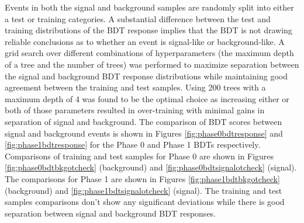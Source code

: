 Events in both the signal and background samples are randomly split into either a test or training categories.  A substantial difference between the test and training distributions of the BDT response implies that the BDT is not drawing reliable conclusions as to whether an event is signal-like or background-like.  A grid search over different combinations of hyperparameters (the maximum depth of a tree and the number of trees) was performed to maximize separation between the signal and background BDT response distributions while maintaining good agreement between the training and test samples.  Using 200 trees with a maximum depth of 4 was found to be the optimal choice as increasing either or both of those parameters resulted in over-training with minimal gains in separation of signal and background. The comparison of BDT scores between signal and background events is shown in Figures \ref{fig:phase0bdtresponse} and \ref{fig:phase1bdtresponse} for the Phase 0 and Phase 1 BDTs respectively.  Comparisons of training and test samples for Phase 0 are shown in Figures \ref{fig:phase0bdtbkgotcheck} (background) and \ref{fig:phase0bdtsignalotcheck} (signal).  The comparisons for Phase 1 are shown in Figures \ref{fig:phase1bdtbkgotcheck} (background) and \ref{fig:phase1bdtsignalotcheck} (signal). The training and test samples comparisons don't show any significant deviations while there is good separation between signal and background BDT responses.


